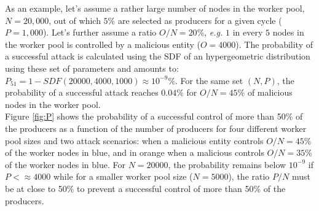 As an example, let's assume a rather large number of nodes in the worker pool, $N = 20,000$, out of which $5\%$ are selected as producers for a given cycle ($P = 1,000$). Let's further assume a ratio $O/N=20\%$, \textit{e.g.} $1$ in every $5$ nodes in the worker pool is controlled by a malicious entity ($O=4000$). The probability of a successful attack is calculated using the SDF of an hypergeometric distribution using these set of parameters and amounts to: $P_{51} = 1-SDF(20000,4000,1000) \approx 10^{-9}\%$. For the same set $(N,P)$, the probability of a successful attack reaches $0.04\%$ for $O/N=45\%$ of malicious nodes in the worker pool. \\

Figure \ref{fig:P} shows the probability of a successful control of more than 50\% of the producers as a function of the number of producers for four different worker pool sizes and two attack scenarios: when a malicious entity controls $O/N = 45\%$ of the worker nodes in blue, and in orange when a malicious controls $O/N = 35\%$ of the worker nodes in blue. For $N=20000$, the probability remains below $10^{-9}$ if $P < \approx 4000$ while for a smaller worker pool size ($N=5000$), the ratio $P/N$ must be at close to 50\% to prevent a successful control of more than 50\% of the producers. 

\newpage

